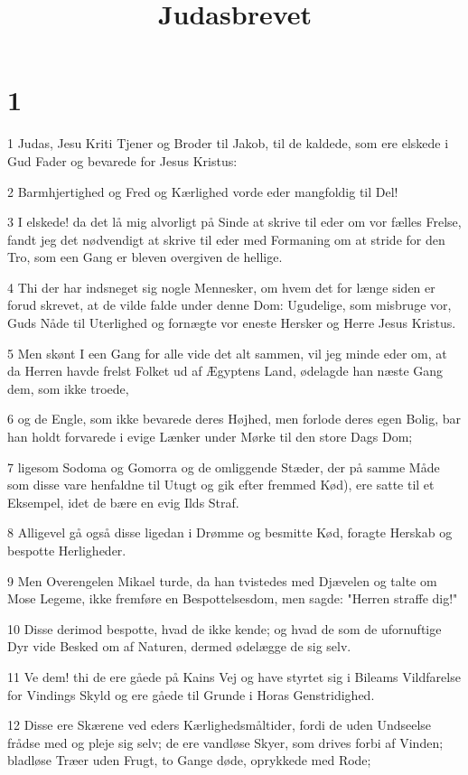 

\title{Judasbrevet}


\chapter{1}

\par 1 Judas, Jesu Kriti Tjener og Broder til Jakob, til de kaldede, som ere elskede i Gud Fader og bevarede for Jesus Kristus:
\par 2 Barmhjertighed og Fred og Kærlighed vorde eder mangfoldig til Del!
\par 3 I elskede! da det lå mig alvorligt på Sinde at skrive til eder om vor fælles Frelse, fandt jeg det nødvendigt at skrive til eder med Formaning om at stride for den Tro, som een Gang er bleven overgiven de hellige.
\par 4 Thi der har indsneget sig nogle Mennesker, om hvem det for længe siden er forud skrevet, at de vilde falde under denne Dom: Ugudelige, som misbruge vor, Guds Nåde til Uterlighed og fornægte vor eneste Hersker og Herre Jesus Kristus.
\par 5 Men skønt I een Gang for alle vide det alt sammen, vil jeg minde eder om, at da Herren havde frelst Folket ud af Ægyptens Land, ødelagde han næste Gang dem, som ikke troede,
\par 6 og de Engle, som ikke bevarede deres Højhed, men forlode deres egen Bolig, bar han holdt forvarede i evige Lænker under Mørke til den store Dags Dom;
\par 7 ligesom Sodoma og Gomorra og de omliggende Stæder, der på samme Måde som disse vare henfaldne til Utugt og gik efter fremmed Kød), ere satte til et Eksempel, idet de bære en evig Ilds Straf.
\par 8 Alligevel gå også disse ligedan i Drømme og besmitte Kød, foragte Herskab og bespotte Herligheder.
\par 9 Men Overengelen Mikael turde, da han tvistedes med Djævelen og talte om Mose Legeme, ikke fremføre en Bespottelsesdom, men sagde: "Herren straffe dig!"
\par 10 Disse derimod bespotte, hvad de ikke kende; og hvad de som de ufornuftige Dyr vide Besked om af Naturen, dermed ødelægge de sig selv.
\par 11 Ve dem! thi de ere gåede på Kains Vej og have styrtet sig i Bileams Vildfarelse for Vindings Skyld og ere gåede til Grunde i Horas Genstridighed.
\par 12 Disse ere Skærene ved eders Kærlighedsmåltider, fordi de uden Undseelse frådse med og pleje sig selv; de ere vandløse Skyer, som drives forbi af Vinden; bladløse Træer uden Frugt, to Gange døde, oprykkede med Rode;
